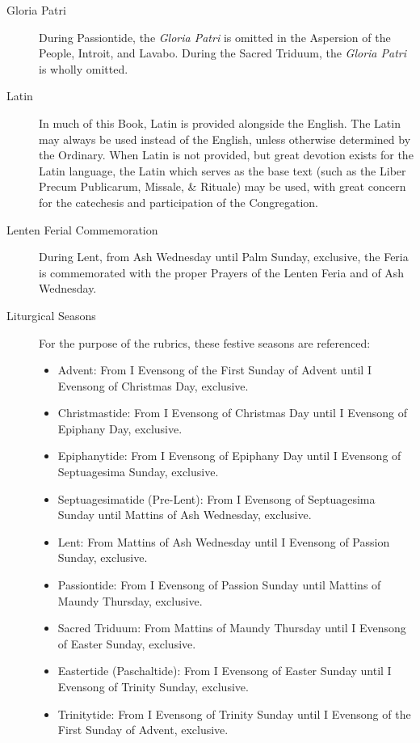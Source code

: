 \begin{description}
\item[Gloria Patri] During Passiontide, the \emph{Gloria Patri} is omitted in the Aspersion of the People, Introit, and Lavabo. During the Sacred Triduum, the \emph{Gloria Patri} is wholly omitted.

\item[Latin] In much of this Book, Latin is provided alongside the English. The Latin may always be used instead of the English, unless otherwise determined by the Ordinary. When Latin is not provided, but great devotion exists for the Latin language, the Latin which serves as the base text (such as the Liber Precum Publicarum, Missale, \& Rituale) may be used, with great concern for the catechesis and participation of the Congregation.

\item[Lenten Ferial Commemoration] During Lent, from Ash Wednesday until Palm Sunday, exclusive, the Feria is commemorated with the proper Prayers of the Lenten Feria and of Ash Wednesday.
	
\item[Liturgical Seasons] For the purpose of the rubrics, these festive seasons are referenced:
    \begin{itemize}
    	\item Advent: From I Evensong of the First Sunday of Advent until I Evensong of Christmas Day, exclusive.
        \item Christmastide: From I Evensong of Christmas Day until I Evensong of Epiphany Day, exclusive.%
        \item Epiphanytide: From I Evensong of Epiphany Day until I Evensong of Septuagesima Sunday, exclusive.
        \item Septuagesimatide (Pre-Lent): From I Evensong of Septuagesima Sunday until Mattins of Ash Wednesday, exclusive.
        \item Lent: From Mattins of Ash Wednesday until I Evensong of Passion Sunday, exclusive.
        \item Passiontide: From I Evensong of Passion Sunday until Mattins of Maundy Thursday, exclusive.
        \item Sacred Triduum: From Mattins of Maundy Thursday until I Evensong of Easter Sunday, exclusive.
        \item Eastertide (Paschaltide): From I Evensong of Easter Sunday until I Evensong of Trinity Sunday, exclusive.
        \item Trinitytide: From I Evensong of Trinity Sunday until I Evensong of the First Sunday of Advent, exclusive.
    \end{itemize}


\end{description}
